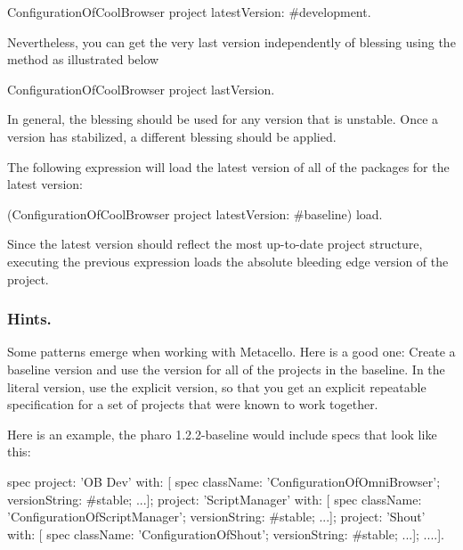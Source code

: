 \documentclass[a4paper,10pt,twoside]{book}
\begin{document}
\begin{code}{}
ConfigurationOfCoolBrowser project latestVersion: #development.
\end{code}

Nevertheless, you can get the very last version independently of blessing using the  method as illustrated below

\begin{code}{}
ConfigurationOfCoolBrowser project lastVersion.
\end{code}

In general, the  blessing should be used for any version that is unstable. Once a version has stabilized, a different blessing should be applied.

The following expression will load the latest version of all of the packages for the latest  version:
 \begin{code}{}
(ConfigurationOfCoolBrowser project latestVersion: #baseline) load.
\end{code}

Since the latest  version should reflect the most up-to-date project structure, executing the previous expression loads the absolute bleeding edge version of the project.


\subsubsection{Hints.}
Some patterns emerge when working with Metacello. Here is a good one:
Create a baseline version and use the  version for all of the projects in the baseline. In the literal version, use the explicit version, so that you get an explicit repeatable specification for a set of projects that were known to work together.

Here is an example, the pharo 1.2.2-baseline would include specs that look like this:

\begin{code}{}
 spec
    project: 'OB Dev' with: [
      spec
         className: 'ConfigurationOfOmniBrowser';
         versionString: #stable;
         ...];
    project: 'ScriptManager' with: [
      spec
         className: 'ConfigurationOfScriptManager';
         versionString: #stable;
         ...];
    project: 'Shout' with: [
      spec
         className: 'ConfigurationOfShout';
         versionString: #stable;
         ...];
    ....].
\end{code}
\end{document}
